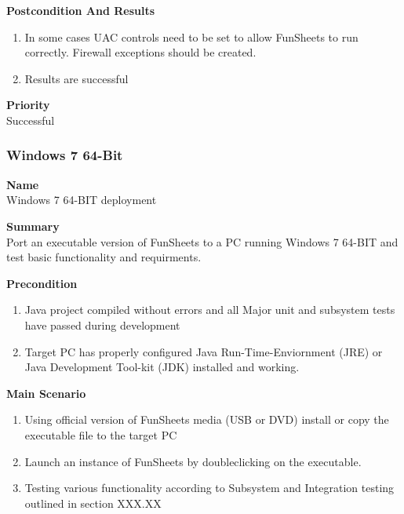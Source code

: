 \documentclass[12pt]{article}
\begin{document}
{\bf Postcondition And Results}\
\begin{enumerate}
\item In some cases UAC controls need to be set to allow FunSheets to run correctly. Firewall exceptions should be created.
\item Results are successful
\end{enumerate}

\noindent
{\bf Priority}\\
Successful
\noindent

\clearpage
\subsubsection{Windows 7 64-Bit} \label{uc:1}

\noindent
{\bf Name}\\
Windows 7 64-BIT deployment

\noindent
{\bf Summary}\\
Port an executable version of FunSheets to a PC running Windows 7 64-BIT and test basic functionality and requirments.

\noindent
{\bf Precondition}\\
\begin{enumerate}
\item Java project compiled without errors and all Major unit and subsystem tests have passed during development
\item Target PC has properly configured Java Run-Time-Enviornment (JRE) or Java Development Tool-kit (JDK) installed and working.
\end{enumerate}

\noindent
{\bf Main Scenario}\
\vspace*{-0.2in}
\begin{enumerate}
\item Using official version of FunSheets media (USB or DVD) install or copy the executable file to the target PC
\item Launch an instance of FunSheets by doubleclicking on the executable.
\item Testing various functionality according to Subsystem and Integration testing outlined in section XXX.XX
\end{enumerate}
\end{document}
